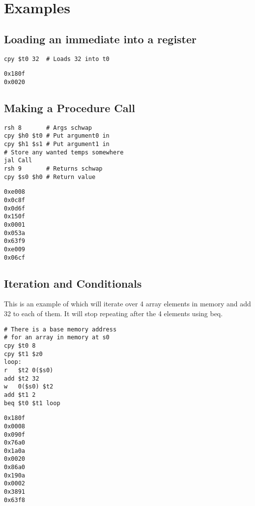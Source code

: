 \section{Examples}
	\lstset{language=sh}
	\subsection{Loading an immediate into a register}
		\begin{multicols}{2}
			\begin{lstlisting}[frame=single]
cpy $t0 32	# Loads 32 into t0
			\end{lstlisting}
		\columnbreak
			\begin{lstlisting}[frame=single]
0x180f
0x0020
			\end{lstlisting}
		\end{multicols}
	\subsection{Making a Procedure Call}
		\begin{multicols}{2}
			\begin{lstlisting}[frame=single]
rsh 8		# Args schwap
cpy $h0 $t0	# Put argument0 in
cpy $h1 $s1	# Put argument1 in
# Store any wanted temps somewhere
jal Call
rsh 9		# Returns schwap
cpy $s0 $h0	# Return value
			\end{lstlisting}
		\columnbreak
			\begin{lstlisting}[frame=single]
0xe008
0x0c8f
0x0d6f
0x150f
0x0001
0x053a
0x63f9
0xe009
0x06cf
			\end{lstlisting}
		\end{multicols}
	\newpage
	\subsection{Iteration and Conditionals}
		This is an example of which will iterate over 4 array elements in memory and add 32 to each of them.  It will stop repeating after the 4 elements using beq.
		\begin{multicols}{2}
			\begin{lstlisting}[frame=single]
# There is a base memory address
# for an array in memory at s0
cpy $t0 8
cpy $t1 $z0
loop:
r   $t2 0($s0)
add $t2 32
w   0($s0) $t2
add $t1 2
beq $t0 $t1 loop
			\end{lstlisting}
		\columnbreak
			\begin{lstlisting}[frame=single]
0x180f
0x0008
0x090f
0x76a0
0x1a0a
0x0020
0x86a0
0x190a
0x0002
0x3891
0x63f8
			\end{lstlisting}
	\end{multicols}
